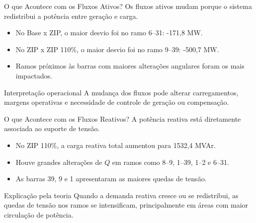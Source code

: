 \documentclass[aspectratio=169,11pt]{beamer}
\begin{document}
\begin{frame}{O que Acontece com os Fluxos Ativos?}
  Os fluxos ativos mudam porque o sistema redistribui a potência entre geração e carga.

  \begin{itemize}
    \item No Base x ZIP, o maior desvio foi no ramo 6--31: -171,8 MW.
    \item No ZIP x ZIP 110\%, o maior desvio foi no ramo 9--39: -500,7 MW.
    \item Ramos próximos às barras com maiores alterações angulares foram os mais impactados.
  \end{itemize}

  \begin{block}{Interpretação operacional}
    A mudança dos fluxos pode alterar carregamentos, margens operativas e necessidade de controle de geração ou compensação.
  \end{block}
\end{frame}

\begin{frame}{O que Acontece com os Fluxos Reativos?}
  A potência reativa está diretamente associada ao suporte de tensão.

  \begin{itemize}
    \item No ZIP 110\%, a carga reativa total aumentou para 1532,4 MVAr.
    \item Houve grandes alterações de $Q$ em ramos como 8--9, 1--39, 1--2 e 6--31.
    \item As barras 39, 9 e 1 apresentaram as maiores quedas de tensão.
  \end{itemize}

  \begin{block}{Explicação pela teoria}
    Quando a demanda reativa cresce ou se redistribui, as quedas de tensão nos ramos se intensificam, principalmente em áreas com maior circulação de potência.
  \end{block}
\end{frame}
\end{document}
